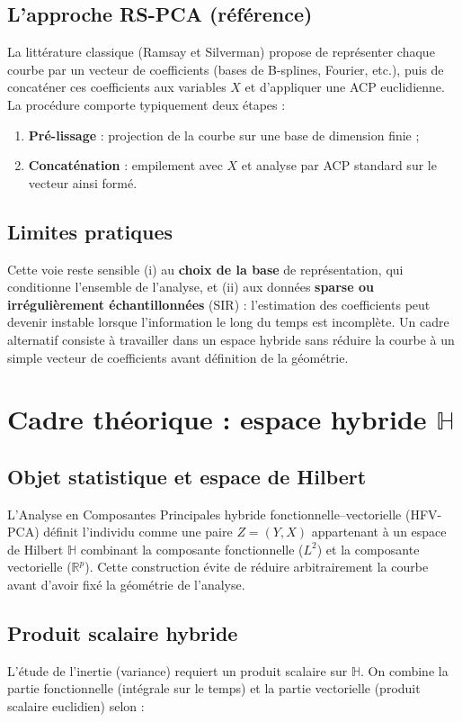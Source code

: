 \documentclass[11pt, a4paper]{article}
\begin{document}
\subsection{L'approche RS-PCA (référence)}
La littérature classique (Ramsay et Silverman) propose de représenter chaque
courbe par un vecteur de coefficients (bases de B-splines, Fourier, etc.),
puis de concaténer ces coefficients aux variables $X$ et d'appliquer une ACP
euclidienne. La procédure comporte typiquement deux étapes :
\begin{enumerate}
    \item \textbf{Pré-lissage} : projection de la courbe sur une base de
    dimension finie ;
    \item \textbf{Concaténation} : empilement avec $X$ et analyse par ACP
    standard sur le vecteur ainsi formé.
\end{enumerate}

\subsection{Limites pratiques}
Cette voie reste sensible (i) au \textbf{choix de la base} de représentation,
qui conditionne l'ensemble de l'analyse, et (ii) aux données \textbf{sparse
ou irrégulièrement échantillonnées} (SIR) : l'estimation des coefficients peut
devenir instable lorsque l'information le long du temps est incomplète. Un
cadre alternatif consiste à travailler dans un espace hybride sans réduire la
courbe à un simple vecteur de coefficients avant définition de la géométrie.

\section{Cadre théorique : espace hybride $\mathbb{H}$}

\subsection{Objet statistique et espace de Hilbert}
L'Analyse en Composantes Principales hybride fonctionnelle--vectorielle
(HFV-PCA) définit l'individu comme une paire $Z = (Y, X)$ appartenant à un
espace de Hilbert $\mathbb{H}$ combinant la composante fonctionnelle ($L^2$)
et la composante vectorielle ($\mathbb{R}^p$). Cette construction évite de
réduire arbitrairement la courbe avant d'avoir fixé la géométrie de
l'analyse.

\subsection{Produit scalaire hybride}
L'étude de l'inertie (variance) requiert un produit scalaire sur $\mathbb{H}$.
On combine la partie fonctionnelle (intégrale sur le temps) et la partie
vectorielle (produit scalaire euclidien) selon :
\end{document}
